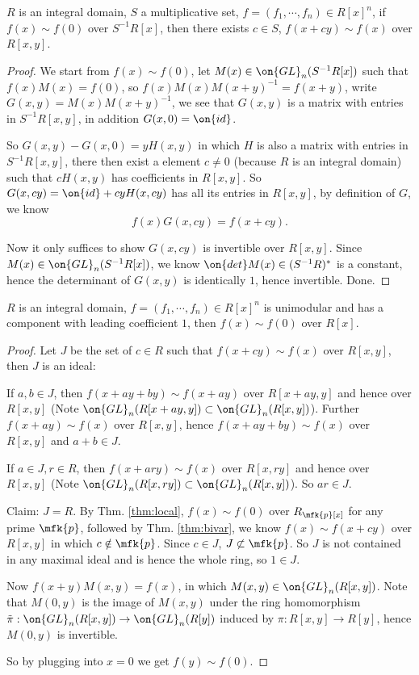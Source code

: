 \begin{thm}\label{thm:bivar}
	$R$ is an integral domain, $S$ a multiplicative set, $f=(f_1,\cdots,f_n)\in R[x]^n$, if $f(x)\sim f(0)$ over $S^{-1}R[x]$, then there exists $c\in S$, $f(x+cy)\sim f(x)$ over $R[x,y]$.
\end{thm}
\begin{proof}
	We start from $f(x)\sim f(0)$, let $M(x)\in\on{GL}_n(S^{-1}R[x])$ such that $f(x)M(x)=f(0)$, so $f(x)M(x)M(x+y)^{-1}=f(x+y)$, write $G(x,y)=M(x)M(x+y)^{-1}$, we see that $G(x,y)$ is a matrix with entries in $S^{-1}R[x,y]$, in addition $G(x,0)=\on{id}$.
	
	So $G(x,y)-G(x,0)=yH(x,y)$ in which $H$ is also a matrix with entries in $S^{-1}R[x,y]$, there then exist a element $c\neq 0$ (because $R$ is an integral domain) such that $cH(x,y)$ has coefficients in $R[x,y]$. So $G(x,cy) = \on{id}+cyH(x,cy)$ has all its entries in $R[x,y]$, by definition of $G$, we know
	$$
	f(x)G(x,cy)=f(x+cy).
	$$
	
	Now it only suffices to show $G(x,cy)$ is invertible over $R[x,y]$. Since $M(x)\in\on{GL}_n(S^{-1}R[x])$, we know $\on{det}M(x)\in (S^{-1}R)^*$ is a constant, hence the determinant of $G(x,y)$ is identically $1$, hence invertible. Done.
\end{proof}

\begin{thm}\label{ID}
	$R$ is an integral domain, $f=(f_1,\cdots,f_n)\in R[x]^n$ is unimodular and has a component with leading coefficient $1$, then $f(x)\sim f(0)$ over $R[x]$.
\end{thm}
\begin{proof}
	Let $J$ be the set of $c\in R$ such that $f(x+cy)\sim f(x)$ over $R[x,y]$, then $J$ is an ideal:
	
	If $a,b\in J$, then $f(x+ay+by)\sim f(x+ay)$ over $R[x+ay, y]$ and hence over $R[x,y]$ (Note $\on{GL}_n(R[x+ay,y])\subset\on{GL}_n(R[x,y])$). Further $f(x+ay)\sim f(x)$ over $R[x,y]$, hence $f(x+ay+by)\sim f(x)$ over $R[x,y]$ and $a+b\in J$.
	
	If $a\in J, r\in R$, then $f(x+ary)\sim f(x)$ over $R[x,ry]$ and hence over $R[x,y]$ (Note $\on{GL}_n(R[x,ry])\subset\on{GL}_n(R[x,y])$). So $ar\in J$.
	
	Claim: $J=R$. By Thm. \ref{thm:local}, $f(x)\sim f(0)$ over $R_\mfk{p}[x]$ for any prime $\mfk{p}$, followed by Thm. \ref{thm:bivar}, we know $f(x)\sim f(x+cy)$ over $R[x,y]$ in which $c\notin \mfk{p}$. Since $c\in J$, $J\not\subset\mfk{p}$. So $J$ is not contained in any maximal ideal and is hence the whole ring, so $1\in J$.
	
	Now $f(x+y)M(x,y)=f(x)$, in which $M(x,y)\in\on{GL}_n(R[x,y])$. Note that $M(0,y)$ is the image of $M(x,y)$ under the ring homomorphism $\tilde{\pi}:\on{GL}_n(R[x,y])\rightarrow\on{GL}_n(R[y])$ induced by $\pi:R[x,y]\rightarrow R[y]$, hence $M(0,y)$ is invertible.
	
	So by plugging into $x=0$ we get $f(y)\sim f(0)$.
\end{proof}

